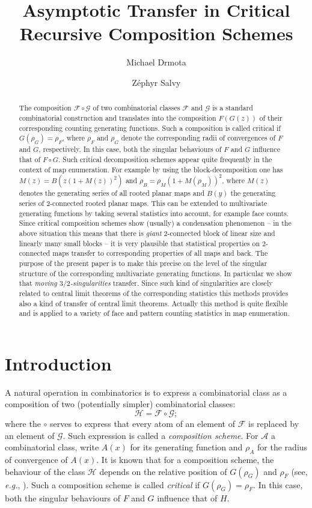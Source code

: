 \documentclass[a4paper,UKenglish,cleveref, autoref, thm-restate]{lipics-v2021}
\title{Asymptotic Transfer in Critical Recursive Composition Schemes}
\author{Michael Drmota}{TU Wien, Institute of Discrete Mathematics and Geometry, Wiedner Hauptstrasse 8-10, A1040 Vienna, Austria}{michael.drmota@tuwien.ac.at}{https://orcid.org/0000-0002-6876-6569}{}
\author{Zéphyr Salvy}{TU Wien, Institute of Discrete Mathematics and Geometry, Wiedner Hauptstrasse 8-10, A1040 Vienna, Austria}{zephyr.salvy@tuwien.ac.at}{}{}
\renewcommand{\(}{\left(}
\renewcommand{\)}{\right)}
\begin{document}
\maketitle

\begin{abstract}
The composition $\mathcal{F} \circ \mathcal{G}$ of two combinatorial classes $\mathcal{F}$ and $\mathcal{G}$ is a standard combinatorial construction and translates into the composition $F(G(z))$ of their corresponding counting generating functions. Such a composition is called critical if $G(\rho_G) = \rho_F$, where $\rho_F$ and $\rho_G$ denote the corresponding radii of convergences of $F$ and $G$, respectively. In this case, both the singular behaviours of $F$ and $G$ influence that of $F\circ G$. Such critical decomposition schemes appear quite frequently in the context of map enumeration. For example by using the block-decomposition one has $M(z) = B\(z\(1+M(z)\)^2\)$ and $\rho_B = \rho_M \(1+M(\rho_M)\)^2$, where $M(z)$ denotes the generating series of all rooted planar maps and $B(y)$ the generating series of $2$-connected rooted planar maps. This can be extended to multivariate generating functions by taking several statistics into account, for example face counts. Since critical composition schemes show (usually) a condensation phenomenon -- in the above situation this means that there is \emph{giant} $2$-connected  block of linear size and linearly many small blocks -- it is very plausible that statistical properties on $2$-connected maps transfer to corresponding properties of all maps and back. The purpose of the present paper is to make this precise on the level of the singular structure of the corresponding multivariate generating functions. In particular we show that \emph{moving $3/2$-singularities} transfer. Since such kind of singularities are closely related to central limit theorems of the corresponding statistics this methods provides also a kind of transfer of central limit theorems. Actually this method is quite flexible and is applied to a variety of face and pattern counting statistics in map enumeration.
\end{abstract}

\section{Introduction}
A natural operation in combinatorics is to express a combinatorial class as a composition of two (potentially simpler) combinatorial classes:
\[\mathcal{H} = \mathcal{F} \circ \mathcal{G};\]
where the $\circ$ serves to express that every atom of an element of $\mathcal{F}$ is replaced by an element of $\mathcal{G}$. Such expression is called a \emph{composition scheme}. For $\mathcal{A}$ a combinatorial class, write $A(x)$ for its generating function and $\rho_A$ for the radius of convergence of $A(x)$. It is known that for a composition scheme, the behaviour of the class $\mathcal{H}$ depends on the relative position of $G(\rho_G)$ and $\rho_F$ (see, \emph{e.g.}, \cite[\S VI.9]{flajolet_sedgewick_2009}). Such a composition scheme
is called  \emph{critical} if  $G(\rho_G) = \rho_F$. In this case, both the singular behaviours of $F$ and $G$ influence that of $H$.
\end{document}
